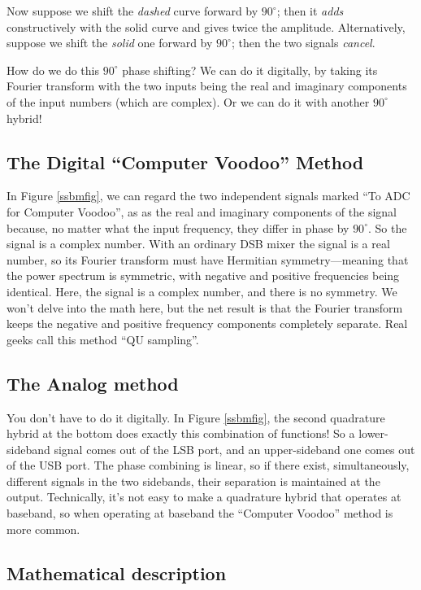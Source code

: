 \documentclass[11pt,preprint]{aastex}
\begin{document}
        Now suppose we shift the {\it dashed} curve forward by
$90^\circ$; then it {\it adds} constructively with the solid curve and
gives twice the amplitude. Alternatively, suppose we shift the {\it
solid} one forward by $90^\circ$; then the two signals {\it cancel}.

How do we do this $90^\circ$ phase shifting? We can do it
digitally, by taking its Fourier transform with the two inputs being the
real and imaginary components of the input numbers (which are complex).
Or we can do it with another
$90^\circ$ hybrid! 

\subsection{The Digital ``Computer Voodoo'' Method}

In Figure \ref{ssbmfig}, we can regard the two independent signals
marked ``To ADC for Computer Voodoo'', as as the real and imaginary
components of the signal because, no matter what the input frequency,
they differ in phase by $90^\circ$. So the signal is a complex
number. With an ordinary DSB mixer the signal is a real number, so its
Fourier transform must have Hermitian symmetry---meaning that the power
spectrum is symmetric, with negative and positive frequencies being
identical. Here, the signal is a complex number, and there is no
symmetry. We won't delve into the math here, but the net result is that
the Fourier transform keeps the negative and positive frequency
components completely separate. Real geeks call this method ``QU
sampling''. 

\subsection{The Analog method}

You don't have to do it digitally. In Figure \ref{ssbmfig}, the second
quadrature hybrid at the bottom does exactly this combination of
functions! So a lower-sideband signal comes out of the LSB port, and an
upper-sideband one comes out of the USB port. The phase combining is
linear, so if there exist, simultaneously, different signals in the two
sidebands, their separation is maintained at the output. Technically,
it's not easy to make a quadrature hybrid that operates at baseband, so
when operating at baseband the ``Computer Voodoo'' method is more
common. 



\subsection{Mathematical description} \label{mathdescr}
\end{document}

